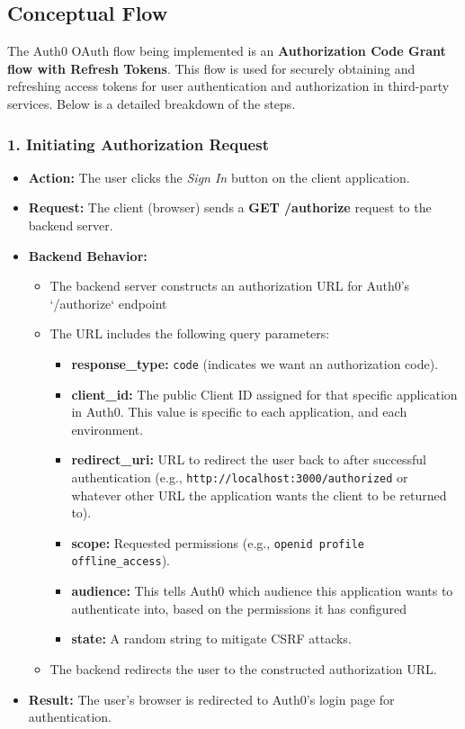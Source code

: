 \documentclass[11pt]{article}
\begin{document}
\subsection{Conceptual Flow}
The Auth0 OAuth flow being implemented is an \textbf{Authorization Code Grant flow with Refresh Tokens}. This flow is used for securely obtaining and refreshing access tokens for user authentication and authorization in third-party services. Below is a detailed breakdown of the steps.

\subsubsection*{1. \textbf{Initiating Authorization Request}}
\begin{itemize}
    \item \textbf{Action:} The user clicks the \textit{Sign In} button on the client application.
    \item \textbf{Request:} The client (browser) sends a \textbf{GET /authorize} request to the backend server.
    \item \textbf{Backend Behavior:}
          \begin{itemize}
              \item The backend server constructs an authorization URL for Auth0's `/authorize` endpoint
              \item The URL includes the following query parameters:
              \begin{itemize}
                  \item \textbf{response\_type:} \texttt{code} (indicates we want an authorization code).
                  \item \textbf{client\_id:} The public Client ID assigned for that specific application in Auth0. This value is specific to each application, and each environment.
                  \item \textbf{redirect\_uri:} URL to redirect the user back to after successful authentication (e.g., \texttt{http://localhost:3000/authorized} or whatever other URL the application wants the client to be returned to).
                  \item \textbf{scope:} Requested permissions (e.g., \texttt{openid profile offline\_access}).
                   \item \textbf{audience:} This tells Auth0 which audience this application wants to authenticate into, based on the permissions it has configured
                  \item \textbf{state:} A random string to mitigate CSRF attacks.
              \end{itemize}
              \item The backend redirects the user to the constructed authorization URL.
          \end{itemize}
    \item \textbf{Result:} The user's browser is redirected to Auth0's login page for authentication.
\end{itemize}
\end{document}
